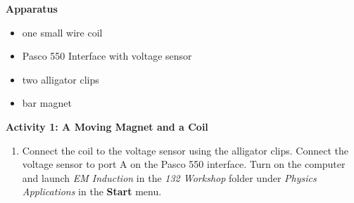 \textbf{Apparatus}

\begin{itemize}[nosep]
\item one small wire coil
\item Pasco 550 Interface with voltage sensor
\item two alligator clips
\item bar magnet
\end{itemize}

\bigskip
\textbf{Activity 1: A Moving Magnet and a Coil}

\begin{enumerate}[labparts]
\setlength\rightmargin{3in}

\item Connect the coil to the voltage sensor using the alligator clips.  Connect the voltage sensor to port A on the Pasco 550 interface.
Turn on the computer and launch \textit{EM Induction} in the \textit{132 Workshop} folder under \textit{Physics Applications} in the \textbf{Start} menu.

\end{enumerate}

\vspace{-0.3in}  

